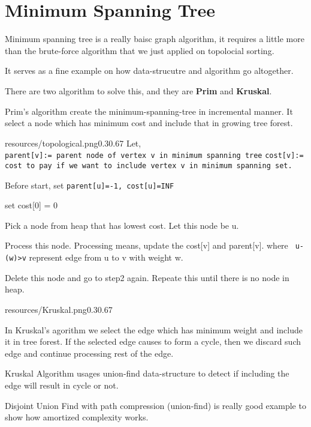 \section{Minimum Spanning Tree}\label{ch:minimum-spanning-tree}

Minimum spanning tree is a really  baisc graph algorithm, it requires a little more than the brute-force algorithm that we just applied on topolocial sorting.

It serves as a fine example on how data-strucutre and algorithm go altogether.

There are two algorithm to solve this, and they are \textbf{Prim} and \textbf{Kruskal}.

Prim's algorithm create the minimum-spanning-tree in incremental manner. It select a node which has minimum cost and include that in growing tree forest.

\begin{lfigure}{resources/topological.png}{0.3}{0.67}
    Let,\\
    \verb|parent[v]:= parent node of vertex v in minimum spanning tree|
    \verb|cost[v]:= cost to pay if we want to include vertex v in minimum spanning set.|

    Before start, set \verb|parent[u]=-1, cost[u]=INF|

    \begin{compactenum}
        \item set cost[0] = 0
        \item Pick a node from heap that has lowest cost. Let this node be u.
        \item Process this node. Processing means, update the cost[v] and parent[v]. where \verb| u-(w)>v| represent edge from u to v with weight w.
        \item Delete this node and go to step2 again. Repeate this until there is no node in heap. 
    \end{compactenum}

\end{lfigure}

\begin{lfigure}{resources/Kruskal.png}{0.3}{0.67}

    In Kruskal's agorithm we select the edge which has minimum weight and include it in tree forest. If the selected edge causes to form a cycle, then we discard such edge and continue processing rest of the edge.

    Kruskal Algorithm usages union-find data-structure to detect if including the edge will result in cycle or not.
\end{lfigure}

Disjoint Union Find with path compression (union-find) is really good example to show  how amortized complexity works.
